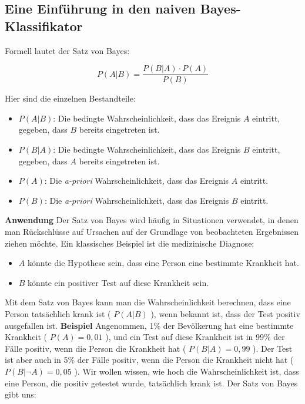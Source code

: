 \documentclass[12pt]{article}
\begin{document}
\subsection{Eine Einführung in den naiven Bayes-Klassifikator}

%
Formell lautet der Satz von Bayes:

\[
P(A|B) = \frac{P(B|A) \cdot P(A)}{P(B)}
\]

Hier sind die einzelnen Bestandteile:

\begin{itemize}
    \item \( P(A|B) \): Die bedingte Wahrscheinlichkeit, dass das Ereignis \( A \) eintritt, gegeben, dass \( B \) bereits eingetreten ist.
    \item \( P(B|A) \): Die bedingte Wahrscheinlichkeit, dass das Ereignis \( B \) eintritt, gegeben, dass \( A \) bereits eingetreten ist.
    \item \( P(A) \): Die \textit{a-priori} Wahrscheinlichkeit, dass das Ereignis \( A \) eintritt.
    \item \( P(B) \): Die \textit{a-priori} Wahrscheinlichkeit, dass das Ereignis \( B \) eintritt.
\end{itemize}
%
\textbf{Anwendung}
%
Der Satz von Bayes wird häufig in Situationen verwendet, in denen man Rückschlüsse auf Ursachen auf der Grundlage von beobachteten Ergebnissen ziehen möchte. Ein klassisches Beispiel ist die medizinische Diagnose:

\begin{itemize}
    \item \( A \) könnte die Hypothese sein, dass eine Person eine bestimmte Krankheit hat.
    \item \( B \) könnte ein positiver Test auf diese Krankheit sein.
\end{itemize}
%
Mit dem Satz von Bayes kann man die Wahrscheinlichkeit berechnen, dass eine Person tatsächlich krank ist ( \( P(A|B) \) ), wenn bekannt ist, dass der Test positiv ausgefallen ist.
%
\textbf{Beispiel}
%
Angenommen, 1\% der Bevölkerung hat eine bestimmte Krankheit ( \( P(A) = 0{,}01 \) ), und ein Test auf diese Krankheit ist in 99\% der Fälle positiv, wenn die Person die Krankheit hat ( \( P(B|A) = 0{,}99 \) ). Der Test ist aber auch in 5\% der Fälle positiv, wenn die Person die Krankheit nicht hat ( \( P(B|\neg A) = 0{,}05 \) ). Wir wollen wissen, wie hoch die Wahrscheinlichkeit ist, dass eine Person, die positiv getestet wurde, tatsächlich krank ist.
%
Der Satz von Bayes gibt uns:
\end{document}
